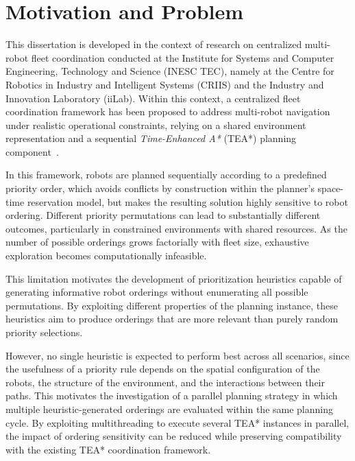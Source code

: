 \section{Motivation and Problem}
\hspace{\parindent}
This dissertation is developed in the context of research on centralized multi-robot fleet
coordination conducted at the Institute
for Systems and Computer Engineering, Technology and Science (INESC TEC), namely at the Centre for Robotics in Industry and Intelligent Systems (CRIIS) and the Industry and Innovation Laboratory (iiLab). Within this context, a
centralized fleet coordination framework has been proposed to address multi-robot navigation under
realistic operational constraints, relying on a shared environment representation and a sequential
\emph{Time-Enhanced A*} (TEA*) planning component~\cite{matos2025criis,santos2016tea}.

In this framework, robots are planned sequentially according to a predefined priority order, which
avoids conflicts by construction within the planner's space-time reservation model, but makes the
resulting solution highly sensitive to robot ordering. Different priority permutations can lead to substantially different outcomes, particularly
in constrained environments with shared resources. As the number of possible orderings grows
factorially with fleet size, exhaustive exploration becomes computationally infeasible.

This limitation motivates the development of prioritization heuristics capable of generating
informative robot orderings without enumerating all possible permutations. By exploiting different
properties of the planning instance, these heuristics aim
to produce orderings that are more relevant than purely random priority selections.

However, no single heuristic is expected to perform best across all scenarios, since the usefulness of
a priority rule depends on the spatial configuration of the robots, the structure of the environment,
and the interactions between their paths. This motivates the investigation of a parallel planning
strategy in which multiple heuristic-generated orderings are evaluated within the same planning
cycle. By exploiting multithreading to execute several TEA* instances in parallel, the impact of
ordering sensitivity can be reduced while preserving compatibility with the existing TEA*
coordination framework.